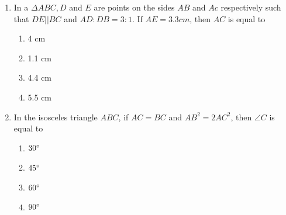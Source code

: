\documentclass{article}
\begin{document}
\begin{enumerate}
\begin{enumerate}
			\item In a $ \Delta ABC, D $ and $ E $ are points on the sides $ AB $ and $ Ac $ 
				respectively such that $ DE || BC $ and $ AD : DB = 3 :1 $. If $ AE = 3.3 cm $, 
				then $ AC $ is equal to
				\begin{enumerate}
					\item 4 cm
					\item 1.1 cm 
					\item 4.4 cm
					\item 5.5 cm
				\end{enumerate}
			\item In the isosceles triangle $ ABC $, if $ AC = BC $ and $ AB^2 = 2AC^2 $, then $ 
				\angle{C} $ is equal to
				\begin{enumerate}
					\item $ 30{\degree} $
					\item $ 45{\degree} $
					\item $ 60{\degree} $
					\item $ 90{\degree} $
				\end{enumerate}
		\end{enumerate}




\end{enumerate}
\end{document}
